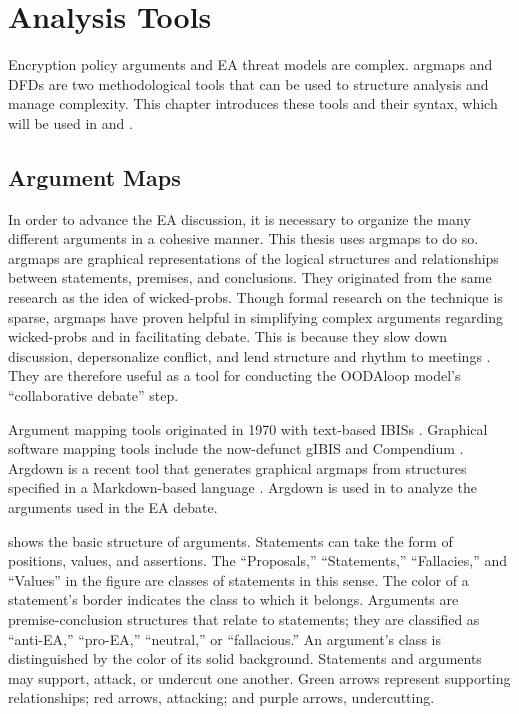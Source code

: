 \chapter{Analysis Tools}
\label{chap-tools}

Encryption policy arguments and \acl{EA} threat models are complex. \Acp{argmap} and \aclp{DFD} are two methodological
tools that can be used to structure analysis and manage complexity. This chapter introduces these tools and their
syntax, which will be used in  and .


\section{Argument Maps}
\label{sec-arg-maps-intro}

In order to advance the \ac{EA} discussion, it is necessary to organize the many different arguments in a cohesive
manner. This thesis uses \acp{argmap} to do so. \Acp{argmap} are graphical representations of the logical structures and
relationships between statements, premises, and conclusions. They originated from the same research as the idea of
\acp{wicked-prob}. Though formal research on the technique is sparse, \acp{argmap} have proven helpful in simplifying
complex arguments regarding \acp{wicked-prob} \cite{renton_2007} and in facilitating debate. This is because they slow
down discussion, depersonalize conflict, and lend structure and rhythm to meetings \cite{dutoit_hypermedia_2006}. They
are therefore useful as a tool for conducting the \ac{OODAloop} model's ``collaborative debate'' step.

Argument mapping tools originated in 1970 with text-based \acp{IBIS} \cite{kunz_issues_1970}. Graphical software mapping
tools include the now-defunct gIBIS \cite{conklin_gibis_1988} and Compendium \cite{dutoit_hypermedia_2006}. Argdown is a
recent tool that generates graphical \acp{argmap} from structures specified in a Markdown-based language
\cite{voigt_argdown_2018}. Argdown is used in  to analyze the arguments used in the \ac{EA}
debate.

 shows the basic structure of arguments. Statements can take the form of positions, values, and
assertions. The ``Proposals,'' ``Statements,'' ``Fallacies,'' and ``Values'' in the figure are classes of statements in
this sense. The color of a statement's border indicates the class to which it belongs. Arguments are premise-conclusion
structures that relate to statements; they are classified as ``anti-EA,'' ``pro-EA,'' ``neutral,'' or ``fallacious.'' An
argument's class is distinguished by the color of its solid background. Statements and arguments may support, attack, or
undercut one another. Green arrows represent supporting relationships; red arrows, attacking; and purple arrows,
undercutting.

